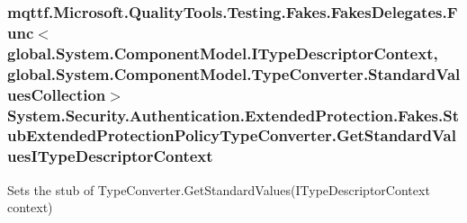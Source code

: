 \hypertarget{class_system_1_1_security_1_1_authentication_1_1_extended_protection_1_1_fakes_1_1_stub_extendedf67afed15bbc0df07bfc91316f6f81f0_aa0af3944071d4d68a9c5d85be384b3b4}{
\subsubsection[{Get\-Standard\-Values\-I\-Type\-Descriptor\-Context}]{\setlength{\rightskip}{0pt plus 5cm}mqttf.\-Microsoft.\-Quality\-Tools.\-Testing.\-Fakes.\-Fakes\-Delegates.\-Func$<$global.\-System.\-Component\-Model.\-I\-Type\-Descriptor\-Context, global.\-System.\-Component\-Model.\-Type\-Converter.\-Standard\-Values\-Collection$>$ System.\-Security.\-Authentication.\-Extended\-Protection.\-Fakes.\-Stub\-Extended\-Protection\-Policy\-Type\-Converter.\-Get\-Standard\-Values\-I\-Type\-Descriptor\-Context}}\label{class_system_1_1_security_1_1_authentication_1_1_extended_protection_1_1_fakes_1_1_stub_extendedf67afed15bbc0df07bfc91316f6f81f0_aa0af3944071d4d68a9c5d85be384b3b4}


Sets the stub of Type\-Converter.\-Get\-Standard\-Values(\-I\-Type\-Descriptor\-Context context)

